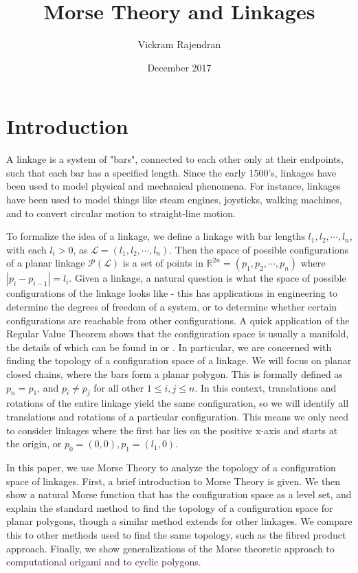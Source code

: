 \documentclass{article}
\title{Morse Theory and Linkages}
\author{Vickram Rajendran}
\date{December 2017}
\begin{document}
\maketitle
\pagestyle{fancy}
\fancyhf{}
\section{Introduction}
A linkage is a system of "bars", connected to each other only at their endpoints, such that each bar has a specified length.  Since the early 1500's, linkages have been used to model physical and mechanical phenomena. For instance, linkages have been used to model things like steam engines, joysticks, walking machines, and to convert circular motion to straight-line motion. 

To formalize the idea of a linkage, we define a linkage with bar lengths $l_1, l_2, \cdots, l_n$, with each $l_i > 0$, as $\mathcal{L} = (l_1, l_2, \cdots, l_n)$. Then the space of possible configurations of a planar linkage $\mathcal{P(L)}$ is a set of points in $\mathbb{R}^{2n} = (p_1, p_2, \cdots, p_n)$ where $|p_i - p_{i-1}| = l_i$. Given a linkage, a natural question is what the space of possible configurations of the linkage looks like - this has applications in engineering to determine the degrees of freedom of a system, or to determine whether certain configurations are reachable from other configurations. A quick application of the Regular Value Theorem shows that the configuration space is usually a manifold, the details of which can be found in \cite{spherical} or \cite{planar}. In particular, we are concerned with finding the topology of a configuration space of a linkage. We will focus on planar closed chains, where the bars form a planar polygon. This is formally defined as $p_n = p_1$, and $p_i \neq p_j$ for all other $1 \leq i, j \leq n$.  In this context, translations and rotations of the entire linkage yield the same configuration, so we will identify all translations and rotations of a particular configuration. This means we only need to consider linkages where the first bar lies on the positive x-axis and starts at the origin, or $p_0 = (0, 0), p_1 = (l_1, 0)$. 

In this paper, we use Morse Theory to analyze the topology of a configuration space of linkages. First, a brief introduction to Morse Theory is given. We then show a natural Morse function that has the configuration space as a level set, and explain the standard method to find the topology of a configuration space for planar polygons, though a similar method extends for other linkages. We compare this to other methods used to find the same topology, such as the fibred product approach. Finally, we show generalizations of the Morse theoretic approach to computational origami and to cyclic polygons. 
\end{document}
